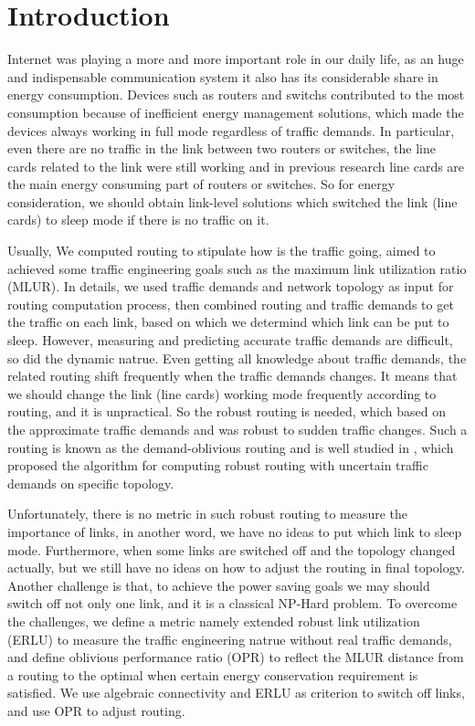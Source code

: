 \documentclass[conference]{IEEEtran}
\begin{document}
\IEEEpeerreviewmaketitle

\section{Introduction}
Internet was playing a more and more important role in our daily life, as an huge and indispensable communication system
it also has its considerable share in energy consumption. Devices such as routers and switchs contributed to the most
consumption because of inefficient energy management solutions, which made the devices always working in full mode 
regardless of traffic demands. In particular, even there are no traffic in the link between two routers or switches, 
the line cards related to the link were still working and in previous research line cards are the main energy consuming part of
routers or switches. So for energy consideration, we should obtain link-level solutions which switched the link (line cards)
to sleep mode if there is no traffic on it.


Usually, We computed routing to stipulate how is the traffic going, aimed to achieved some traffic engineering goals such as 
the maximum link utilization ratio (MLUR). In details, we used traffic demands and network topology as input for routing 
computation process, then combined routing and traffic demands to get the traffic on each link, based on which we determind
which link can be put to sleep. However, measuring and predicting accurate traffic demands are difficult, so did the dynamic
natrue. Even getting all knowledge about traffic demands, the related routing shift frequently when the traffic demands
changes. It means that we should change the link (line cards) working mode frequently according to routing, and it is 
unpractical. So the robust routing is needed, which based on the approximate traffic demands and was robust to sudden traffic changes.
Such a routing is known as the demand-oblivious routing and is well studied in \cite{networking:oblivious}, which proposed
the algorithm for computing robust routing with uncertain traffic demands on specific topology.


Unfortunately, there is no metric in such robust routing to measure the importance of links, in another word, we have no 
ideas to put which link to sleep mode. Furthermore, when some links are switched off and the topology changed actually, but we 
still have no ideas on how to adjust the routing in final topology. Another challenge is that, to achieve the power saving
goals we may should switch off not only one link, and it is a classical NP-Hard problem. To overcome the challenges,
we define a metric namely extended robust link utilization (ERLU) to measure the traffic engineering natrue without real traffic 
demands, and define oblivious performance ratio (OPR) to reflect the MLUR distance from a routing to the optimal
when certain energy conservation requirement is satisfied. We use algebraic connectivity \cite{networking:algebraic} and 
ERLU as criterion to switch off links, and use OPR to adjust routing.
\end{document}
